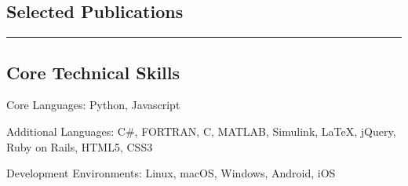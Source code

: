 \documentclass[10pt,letterpaper]{article}
\newenvironment{indentsection}[1]%
{\begin{list}{}%
	{\setlength{\leftmargin}{#1}}%
	\item[]%
}
{\end{list}}
\newcommand{\CPP}
{C\nolinebreak[4]\hspace{-.05em}\raisebox{.22ex}{\footnotesize\bf ++}}
\begin{document}
\subsection*{Selected Publications}

\nocite{*}
\renewcommand{\section}[2]{}%


\hrule
\vspace{-0.4em}
\subsection*{Core Technical Skills}

\begin{indentsection}{\parindent}
\begin{description*}
	\item[Core Languages:]
	Python, Javascript
	\item[Additional Languages:]
	C\#, FORTRAN, \CPP, MATLAB, Simulink, \LaTeX, jQuery, Ruby on Rails, HTML5, CSS3
	\item[Development Environments:]
	Linux, macOS, Windows, Android, iOS
\end{description*}
\end{indentsection}
\end{document}
